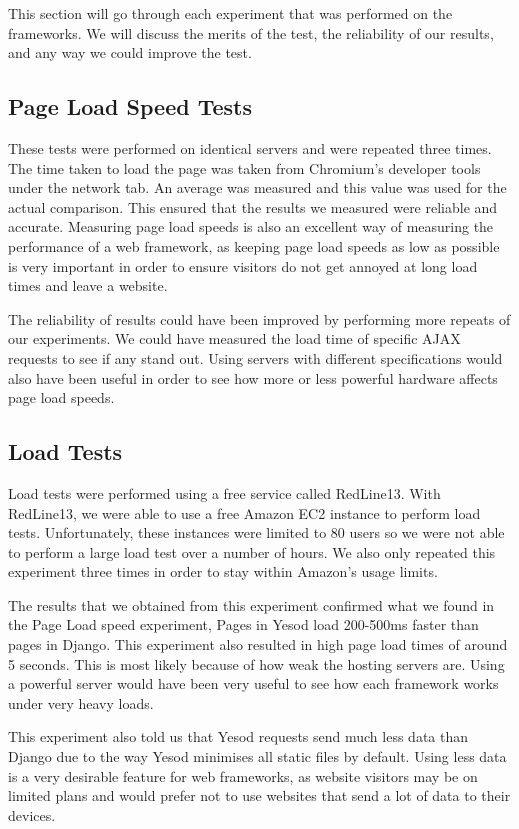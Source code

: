 This section will go through each experiment that was performed
on the frameworks. We will discuss the merits of the test,
the reliability of our results, and any way we could improve
the test.

\subsection{Page Load Speed Tests}

These tests were performed on identical servers and were repeated
three times. The time taken to load the page was taken from Chromium's
developer tools under the network tab. An average was measured and
this value was used for the actual comparison. This ensured that
the results we measured were reliable and accurate. Measuring page
load speeds is also an excellent way of measuring the performance
of a web framework, as keeping page load speeds as low as possible
is very important in order to ensure visitors do not get annoyed at
long load times and leave a website.

The reliability of results could have been improved by performing
more repeats of our experiments. We could have measured the load
time of specific AJAX requests to see if any stand out. Using
servers with different specifications would also have been useful
in order to see how more or less powerful hardware affects page
load speeds.

\subsection{Load Tests}

Load tests were performed using a free service called RedLine13. With
RedLine13, we were able to use a free Amazon EC2 instance to perform
load tests. Unfortunately, these instances were limited to 80 users
so we were not able to perform a large load test over a number of hours.
We also only repeated this experiment three times in order to stay
within Amazon's usage limits.

The results that we obtained from this experiment confirmed what we found in the
Page Load speed experiment, Pages in Yesod load 200-500ms faster than pages in Django.
This experiment also resulted in high page load times of around 5 seconds. This
is most likely because of how weak the hosting servers are. Using
a powerful server would have been very useful to see how each framework
works under very heavy loads.

This experiment also told us that Yesod requests send much less data than Django
due to the way Yesod minimises all static files by default.
Using less data is a very desirable feature for web frameworks, as website
visitors may be on limited plans and would prefer not to use websites
that send a lot of data to their devices.

